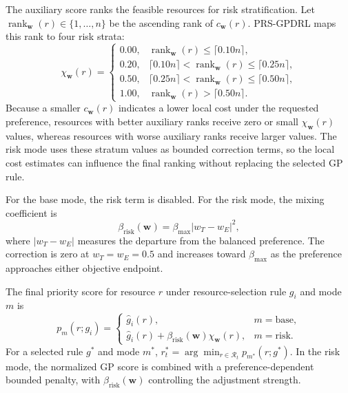 \documentclass[10pt,journal]{IEEEtran}
\begin{document}
The auxiliary score ranks the feasible resources for risk stratification. Let $\operatorname{rank}_{\mathbf{w}}(r)\in\{1,\ldots,n\}$ be the ascending rank of $c_{\mathbf{w}}(r)$. PRS-GPDRL maps this rank to four risk strata:
\begin{equation}
    \chi_{\mathbf{w}}(r) =
    \begin{cases}
        0.00, & \operatorname{rank}_{\mathbf{w}}(r) \leq \lceil 0.10n \rceil,\\
        0.20, & \lceil 0.10n \rceil < \operatorname{rank}_{\mathbf{w}}(r) \leq \lceil 0.25n \rceil,\\
        0.50, & \lceil 0.25n \rceil < \operatorname{rank}_{\mathbf{w}}(r) \leq \lceil 0.50n \rceil,\\
        1.00, & \operatorname{rank}_{\mathbf{w}}(r) > \lceil 0.50n \rceil.
    \end{cases}
    \label{Eq: risk strata}
\end{equation}
Because a smaller $c_{\mathbf{w}}(r)$ indicates a lower local cost under the requested preference, resources with better auxiliary ranks receive zero or small $\chi_{\mathbf{w}}(r)$ values, whereas resources with worse auxiliary ranks receive larger values. The risk mode uses these stratum values as bounded correction terms, so the local cost estimates can influence the final ranking without replacing the selected GP rule.

For the base mode, the risk term is disabled. For the risk mode, the mixing
coefficient is
\begin{equation}
    \beta_{\mathrm{risk}}(\mathbf{w}) =
    \beta_{\max}|w_T-w_E|^2,
    \label{Eq: risk mix}
\end{equation}
where $|w_T-w_E|$ measures the departure from the balanced preference. The correction is zero at $w_T=w_E=0.5$ and increases toward $\beta_{\max}$ as the preference approaches either objective endpoint.

The final priority score for resource $r$ under resource-selection rule $g_i$ and mode $m$ is
\begin{equation}
    p_m(r;g_i) =
    \begin{cases}
    \hat{g}_i(r), & m=\mathrm{base},\\
    \hat{g}_i(r)
    +\beta_{\mathrm{risk}}(\mathbf{w})\chi_{\mathbf{w}}(r),
    & m=\mathrm{risk}.
    \end{cases}
    \label{Eq: risk priority}
\end{equation}
For a selected rule $g^*$ and mode $m^*$,
$r_t^*=\arg\min_{r\in\mathcal{R}_t}p_{m^*}(r;g^*)$.
In the risk mode, the normalized GP score is combined with a preference-dependent bounded penalty, with $\beta_{\mathrm{risk}}(\mathbf{w})$ controlling the adjustment strength.
\end{document}
